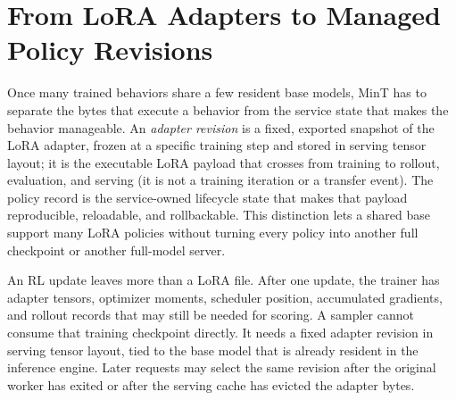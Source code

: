 \documentclass{llmxive}
\begin{document}

\section{From LoRA Adapters to Managed Policy Revisions}

Once many trained behaviors share a few resident base models, MinT has to separate the bytes that execute a behavior from the service state that makes the behavior manageable. An \emph{adapter revision} is a fixed, exported snapshot of the LoRA adapter, frozen at a specific training step and stored in serving tensor layout; it is the executable LoRA payload that crosses from training to rollout, evaluation, and serving (it is not a training iteration or a transfer event). The policy record is the service-owned lifecycle state that makes that payload reproducible, reloadable, and rollbackable. This distinction lets a shared base support many LoRA policies without turning every policy into another full checkpoint or another full-model server.

An RL update leaves more than a LoRA file. After one update, the trainer has adapter tensors, optimizer moments, scheduler position, accumulated gradients, and rollout records that may still be needed for scoring. A sampler cannot consume that training checkpoint directly. It needs a fixed adapter revision in serving tensor layout, tied to the base model that is already resident in the inference engine. Later requests may select the same revision after the original worker has exited or after the serving cache has evicted the adapter bytes.
\end{document}
